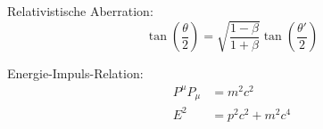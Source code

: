 			\noindent
			Relativistische Aberration:
			\begin{equation}
				\tan\left(\frac{\theta}{2}\right) = \sqrt{\frac{1-\beta}{1+\beta}}\tan\left(\frac{\theta'}{2}\right)
			\end{equation}

			\noindent
			Energie-Impuls-Relation:
			\begin{equation}
				\begin{aligned}
					P^\mu P_\mu &= m^2 c^2\\
					E^2 &= p^2 c^2 + m^2 c^4 \\
				\end{aligned}
			\end{equation}
			\newpage
